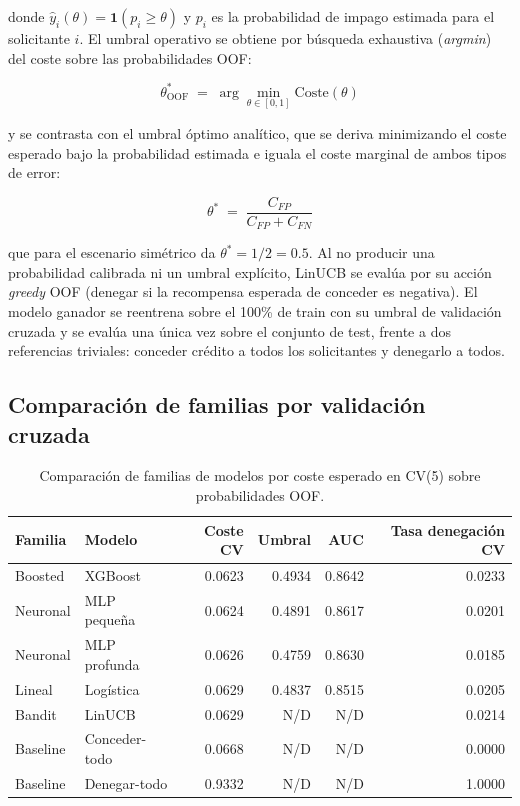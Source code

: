 \documentclass[11pt,a4paper]{article}
\begin{document}
donde $\hat y_i(\theta) = \mathbf{1}(p_i \geq \theta)$ y $p_i$ es la probabilidad de impago estimada
para el solicitante $i$. El umbral operativo se obtiene por b\'usqueda exhaustiva (\emph{argmin}) del
coste sobre las probabilidades OOF:

\[
\theta_{\text{OOF}}^{*} \;=\; \arg\min_{\theta \in [0,1]} \text{Coste}(\theta)
\]

y se contrasta con el umbral \'optimo anal\'itico, que se deriva minimizando el coste esperado bajo la
probabilidad estimada e iguala el coste marginal de ambos tipos de error:

\[
\theta^{*} \;=\; \frac{C_{FP}}{C_{FP}+C_{FN}}
\]

que para el escenario sim\'etrico da $\theta^{*} = 1/2 = 0.5$. Al no producir una probabilidad
calibrada ni un umbral expl\'icito, LinUCB se eval\'ua por su acci\'on \emph{greedy} OOF (denegar si la
recompensa esperada de conceder es negativa). El modelo ganador se reentrena sobre el 100\% de
train con su umbral de validaci\'on cruzada y se eval\'ua una \'unica vez sobre el conjunto de test,
frente a dos referencias triviales: conceder cr\'edito a todos los solicitantes y denegarlo a todos.

\subsection{Comparaci\'on de familias por validaci\'on cruzada}

\begin{table}[H]
\centering
\caption{Comparaci\'on de familias de modelos por coste esperado en CV(5) sobre probabilidades OOF.}
\label{tab:comparacion-familias-c1}
\begin{tabular}{llrrrr}
\toprule
Familia & Modelo & Coste CV & Umbral & AUC & Tasa denegaci\'on CV \\
\midrule
Boosted        & XGBoost        & 0.0623 & 0.4934 & 0.8642 & 0.0233 \\
Neuronal       & MLP peque\~na  & 0.0624 & 0.4891 & 0.8617 & 0.0201 \\
Neuronal       & MLP profunda   & 0.0626 & 0.4759 & 0.8630 & 0.0185 \\
Lineal         & Log\'istica    & 0.0629 & 0.4837 & 0.8515 & 0.0205 \\
Bandit         & LinUCB         & 0.0629 & N/D    & N/D    & 0.0214 \\
Baseline       & Conceder-todo  & 0.0668 & N/D    & N/D    & 0.0000 \\
Baseline       & Denegar-todo   & 0.9332 & N/D    & N/D    & 1.0000 \\
\bottomrule
\end{tabular}
\end{table}
\end{document}

